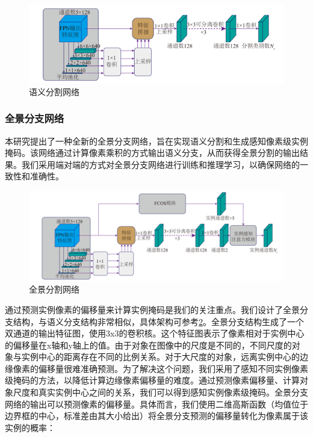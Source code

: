 \begin{figure}[!h] %
    \centering %
    \includegraphics[scale=0.8]{fig/chap2/图片4.png} %
    \caption{语义分割网络}
    \label{fig4} %
    \end{figure}

\subsubsection{全景分支网络}
本研究提出了一种全新的全景分支网络，旨在实现语义分割和生成感知像素级实例掩码。该网络通过计算像素乘积的方式输出语义分支，从而获得全景分割的输出结果。我们采用端对端的方式对全景分支网络进行训练和推理学习，以确保网络的一致性和准确性。
\begin{figure}[!h] %
    \centering %
    \includegraphics[scale=0.8]{fig/chap2/图片5.png} %
    \caption{全景分割网络}
    \label{fig5} %
    \end{figure}

通过预测实例像素的偏移量来计算实例掩码是我们的关注重点。我们设计了全景分支结构，与语义分支结构非常相似，具体架构可参考\cref*{fig5}。全景分支结构生成了一个双通道的输出特征图，使用3x3的卷积核。这个特征图表示了像素相对于实例中心的偏移量在x轴和y轴上的值。由于对象在图像中的尺度是不同的，不同尺度的对象与实例中心的距离存在不同的比例关系。对于大尺度的对象，远离实例中心的边缘像素的偏移量很难准确预测。为了解决这个问题，我们采用了感知不同实例像素级掩码的方法，以降低计算边缘像素偏移量的难度。通过预测像素偏移量、计算对象尺度和真实实例中心之间的关系，我们可以得到感知实例像素级掩码。全景分支网络的输出可以预测像素的偏移量。具体而言，我们使用二维高斯函数（均值位于边界框的中心，标准差由其大小给出）将全景分支预测的偏移量转化为像素属于该实例的概率：


